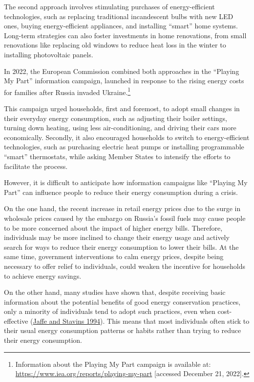 \documentclass[
  11pt,
  captions=heading]{scrreport}
\begin{document}
The second approach involves stimulating purchases of energy-efficient
technologies, such as replacing traditional incandescent bulbs with new
LED ones, buying energy-efficient appliances, and installing ``smart''
home systems. Long-term strategies can also foster investments in home
renovations, from small renovations like replacing old windows to reduce
heat loss in the winter to installing photovoltaic panels.

In 2022, the European Commission combined both approaches in the
``Playing My Part'' information campaign, launched in response to the
rising energy costs for families after Russia invaded
Ukraine.\footnote{Information about the Playing My Part campaign is
  available at: \url{https://www.iea.org/reports/playing-my-part}
  {[}accessed December 21, 2022{]}.}

This campaign urged households, first and foremost, to adopt small
changes in their everyday energy consumption, such as adjusting their
boiler settings, turning down heating, using less air-conditioning, and
driving their cars more economically. Secondly, it also encouraged
households to switch to energy-efficient technologies, such as
purchasing electric heat pumps or installing programmable ``smart''
thermostats, while asking Member States to intensify the efforts to
facilitate the process.

However, it is difficult to anticipate how information campaigns like
``Playing My Part'' can influence people to reduce their energy
consumption during a crisis.

On the one hand, the recent increase in retail energy prices due to the
surge in wholesale prices caused by the embargo on Russia's fossil fuels
may cause people to be more concerned about the impact of higher energy
bills. Therefore, individuals may be more inclined to change their
energy usage and actively search for ways to reduce their energy
consumption to lower their bills. At the same time, government
interventions to calm energy prices, despite being necessary to offer
relief to individuals, could weaken the incentive for households to
achieve energy savings.

On the other hand, many studies have shown that, despite receiving basic
information about the potential benefits of good energy conservation
practices, only a minority of individuals tend to adopt such practices,
even when cost-effective (\protect\hyperlink{ref-jaffe1994energy}{Jaffe
and Stavins 1994}). This means that most individuals often stick to
their usual energy consumption patterns or habits rather than trying to
reduce their energy consumption.
\end{document}
